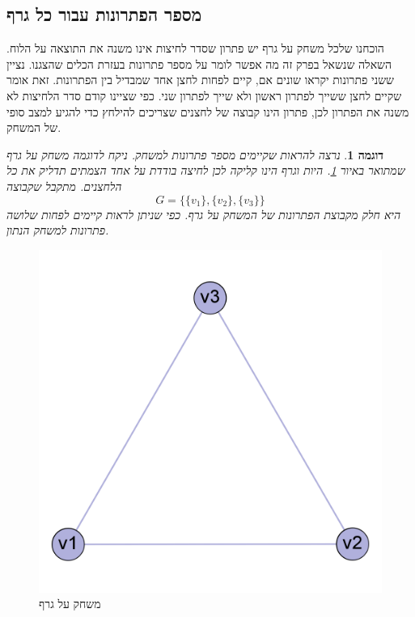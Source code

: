 \documentclass[12pt,leqno]{article}
\theoremstyle{theoremdd}
\newtheorem{example}{דוגמה}[section]
\begin{document}
\subsection{מספר הפתרונות עבור כל גרף}
הוכחנו שלכל משחק על גרף יש פתרון שסדר לחיצות
אינו משנה את התוצאה על הלוח.
השאלה  שנשאל בפרק זה מה אפשר לומר על מספר פתרונות בעזרת הכלים שהצגנו.
נציין ששני פתרונות יקראו שונים אם, קיים לפחות לחצן אחד שמבדיל בין הפתרונות.
זאת אומר שקיים לחצן ששייך לפתרון ראשון ולא שייך לפתרון שני.
כפי שציינו קודם סדר הלחיצות לא משנה את הפתרון לכן, פתרון הינו קבוצה של לחצנים
שצריכים להילחץ כדי להגיע למצב סופי של המשחק.
\begin{example}
    נרצה להראות שקיימים מספר פתרונות למשחק.
    ניקח לדוגמה משחק על גרף שמתואר באיור 
    \ref{fig: clic 3 node graph game}.
    היות וגרף הינו קליקה לכן לחיצה בודדת על אחד הצמתים תדליק את כל הלחצנים.
    מתקבל שקבוצה
    \[G = \{\{v_1\}, \{v_2\}, \{v_3\} \}\]
    היא חלק מקבוצת הפתרונות של המשחק על גרף.
    כפי שניתן לראות קיימים לפחות שלושה פתרונות למשחק הנתון.
\end{example}

\begin{figure}[ht]
    \caption{משחק על גרף}
    \label{fig: clic 3 node graph game} 
    \centering
    \includegraphics[width=.3\textwidth,keepaspectratio]{images/clic_graph_3_node.png}
\end{figure}
\end{document}
